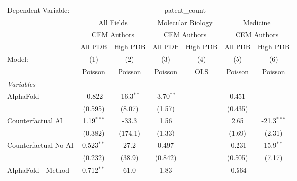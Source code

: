 \begingroup
\centering
\begin{tabular}{lcccccc}
   \tabularnewline \midrule \midrule
   Dependent Variable: & \multicolumn{6}{c}{patent\_count}\\
 & \multicolumn{2}{c}{All Fields} & \multicolumn{2}{c}{Molecular Biology} & \multicolumn{2}{c}{Medicine} \\
\cmidrule(lr){2-3} \cmidrule(lr){4-5} \cmidrule(lr){6-7}
 & \multicolumn{2}{c}{CEM Authors} & \multicolumn{2}{c}{CEM Authors} & \multicolumn{2}{c}{CEM Authors} \\
\cmidrule(lr){2-3} \cmidrule(lr){4-5} \cmidrule(lr){6-7}
 & \multicolumn{1}{c}{All PDB} & \multicolumn{1}{c}{High PDB} & \multicolumn{1}{c}{All PDB} & \multicolumn{1}{c}{High PDB} & \multicolumn{1}{c}{All PDB} & \multicolumn{1}{c}{High PDB} \\
\cmidrule(lr){2-2} \cmidrule(lr){3-3} \cmidrule(lr){4-4} \cmidrule(lr){5-5} \cmidrule(lr){6-6} \cmidrule(lr){7-7}
   Model:                                                     & (1)           & (2)          & (3)          & (4)  & (5)           & (6)\\  
                                                              &  Poisson      & Poisson      & Poisson      & OLS  & Poisson       & Poisson\\  
   \midrule
   \emph{Variables}\\
   AlphaFold                                                  & -0.822        & -16.3$^{**}$ & -3.70$^{**}$ &      & 0.451         &   \\   
                                                              & (0.595)       & (8.07)       & (1.57)       &      & (0.435)       &   \\   
   Counterfactual AI                                          & 1.19$^{***}$  & -33.3        & 1.56         &      & 2.65          & -21.3$^{***}$\\   
                                                              & (0.382)       & (174.1)      & (1.33)       &      & (1.69)        & (2.31)\\   
   Counterfactual No AI                                       & 0.523$^{**}$  & 27.2         & 0.497        &      & -0.231        & 15.9$^{**}$\\   
                                                              & (0.232)       & (38.9)       & (0.842)      &      & (0.505)       & (7.17)\\   
   AlphaFold - Method                                         & 0.712$^{**}$  & 61.0         & 1.83         &      & -0.564        &   \\   

\end{tabular}
